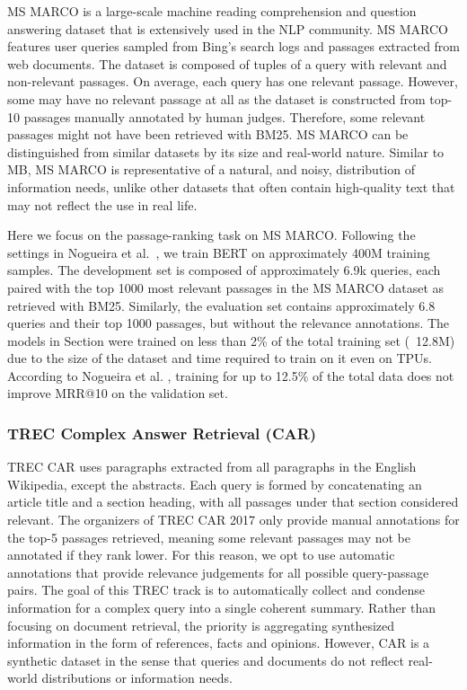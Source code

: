 MS MARCO is a large-scale machine reading comprehension and question answering dataset that is extensively used in the NLP community.
MS MARCO \cite{nguyen2016msmarco} features user queries sampled from Bing’s search logs and passages extracted from web documents.
The dataset is composed of tuples of a query with relevant and non-relevant passages.
On average, each query has one relevant passage.
However, some may have no relevant passage at all as the dataset is constructed from  top-10 passages manually annotated by human judges.
Therefore, some relevant passages might not have been retrieved with BM25.
MS MARCO can be distinguished from similar datasets by its size and real-world nature.
Similar to MB, MS MARCO is representative of a natural, and noisy, distribution of information needs, unlike other datasets that often contain high-quality text that may not reflect the use in real life.

Here we focus on the passage-ranking task on MS MARCO.
Following the settings in Nogueira et al.~\cite{}, we train BERT on approximately 400M training samples.
The development set is composed of approximately 6.9k queries, each paired with the top 1000 most relevant passages in the MS MARCO dataset as retrieved with BM25.
Similarly, the evaluation set contains approximately 6.8 queries and their top 1000 passages, but without the relevance annotations.
The models in Section  were trained on less than 2\% of the total training set (~12.8M) due to the size of the dataset and time required to train on it even on TPUs.
According to Nogueira et al. \cite{nogueira2019passage}, training for up to 12.5\% of the total data does not improve MRR@10 on the validation set.

\subsubsection{TREC Complex Answer Retrieval (CAR)}


TREC CAR \cite{dietz2017trec} uses paragraphs extracted from all paragraphs in the English Wikipedia, except the abstracts.
Each query is formed by concatenating an article title and a section heading, with all passages under that section considered relevant.
The organizers of TREC CAR 2017 only provide manual annotations for the top-5 passages retrieved, meaning some relevant passages may not be annotated if they rank lower.
For this reason, we opt to use automatic annotations that provide relevance judgements for all possible query-passage pairs.
The goal of this TREC track is to automatically collect and condense information for a complex query into a single coherent summary.
Rather than focusing on document retrieval, the priority is aggregating synthesized information in the form of references, facts and opinions.
However, CAR is a synthetic dataset in the sense that queries and documents do not reflect real-world distributions or information needs.

